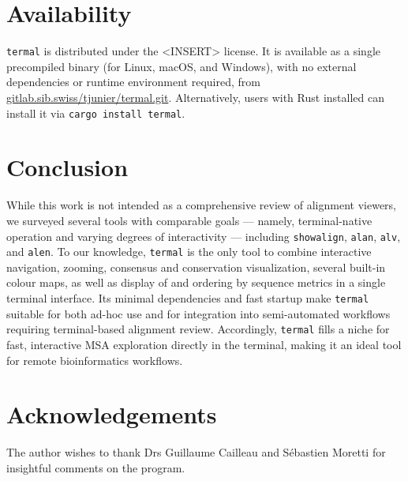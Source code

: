 \documentclass[11pt]{article}
\begin{document}
\section*{Availability}

\texttt{termal} is distributed under the <INSERT> license. It is available as a
single precompiled binary (for Linux, macOS, and Windows), with no external
dependencies or runtime environment required, from
\url{gitlab.sib.swiss/tjunier/termal.git}. Alternatively, users with Rust
installed can install it via \texttt{cargo install termal}.

\section*{Conclusion}

While this work is not intended as a comprehensive review of alignment viewers,
we surveyed several tools with comparable goals — namely, terminal-native
operation and varying degrees of interactivity — including \texttt{showalign},
\texttt{alan}, \texttt{alv}, and \texttt{alen}.  To our knowledge,
\texttt{termal} is the only tool to combine interactive navigation, zooming,
consensus and conservation visualization, several built-in colour maps, as well
as display of and ordering by sequence metrics in a single terminal interface.
Its minimal dependencies and fast startup make \texttt{termal} suitable for both
ad-hoc use and for integration into semi-automated workflows requiring
terminal-based alignment review. Accordingly, \texttt{termal} fills a niche for
fast, interactive MSA exploration directly in the terminal, making it an ideal
tool for remote bioinformatics workflows.

\section*{Acknowledgements}

The author wishes to thank Drs Guillaume Cailleau and Sébastien Moretti for
insightful comments on the program.


\end{document}
